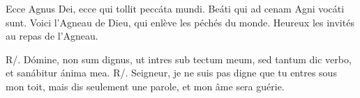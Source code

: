 
\begin{paracol}{2}

\LigneParacol
{Ecce Agnus Dei, ecce qui tollit peccáta mundi. Beáti qui ad cenam Agni vocáti sunt.}
{Voici l’Agneau de Dieu, qui enlève les péchés du monde. Heureux les invités au repas de l'Agneau.}

\LigneParacol
{R/. Dómine, non sum dignus, ut intres sub tectum meum, sed tantum dic verbo, et sanábitur ánima mea.}
{R/. Seigneur, je ne suis pas digne que tu entres sous mon toit, mais dis seulement une parole, et mon âme sera guérie.}

\end{paracol}
